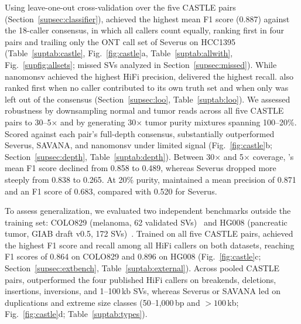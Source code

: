 Using leave-one-out cross-validation over the five CASTLE pairs (Section~\ref{supsec:classifier}), \tool achieved the highest mean F1 score (0.887) against the 18-caller consensus, in which all callers count equally, ranking first in four pairs and trailing only the ONT call set of Severus on HCC1395 (Table~\ref{suptab:castle}, Fig.~\ref{fig:castle}a, Table~\ref{suptab:allwith}, Fig.~\ref{supfig:allsets}; missed SVs analyzed in Section~\ref{supsec:missed}). While nanomonsv achieved the highest HiFi precision, \tool delivered the highest recall. \tool also ranked first when no caller contributed to its own truth set and when only \tool was left out of the consensus (Section~\ref{supsec:loo}, Table~\ref{suptab:loo}). We assessed robustness by downsampling normal and tumor reads across all five CASTLE pairs to 30--5$\times$ and by generating 30$\times$ tumor purity mixtures spanning 100--20\%. Scored against each pair's full-depth consensus, \tool substantially outperformed Severus, SAVANA, and nanomonsv under limited signal (Fig.~\ref{fig:castle}b; Section~\ref{supsec:depth}, Table~\ref{suptab:depth}). Between 30$\times$ and 5$\times$ coverage, \tool's mean F1 score declined from 0.858 to 0.489, whereas Severus dropped more steeply from 0.838 to 0.265. At 20\% purity, \tool maintained a mean precision of 0.871 and an F1 score of 0.683, compared with 0.520 for Severus.

To assess generalization, we evaluated two independent benchmarks outside the training set: COLO829 (melanoma, 62 validated SVs)~\cite{colo829} and HG008 (pancreatic tumor, GIAB draft v0.5, 172 SVs)~\cite{hg008,hg008bench}. Trained on all five CASTLE pairs, \tool achieved the highest F1 score and recall among all HiFi callers on both datasets, reaching F1 scores of 0.864 on COLO829 and 0.896 on HG008 (Fig.~\ref{fig:castle}c; Section~\ref{supsec:extbench}, Table~\ref{suptab:external}). Across pooled CASTLE pairs, \tool outperformed the four published HiFi callers on breakends, deletions, insertions, inversions, and 1--100\,kb SVs, whereas Severus or SAVANA led on duplications and extreme size classes (50--1,000\,bp and $>100$\,kb; Fig.~\ref{fig:castle}d; Table~\ref{suptab:types}).

